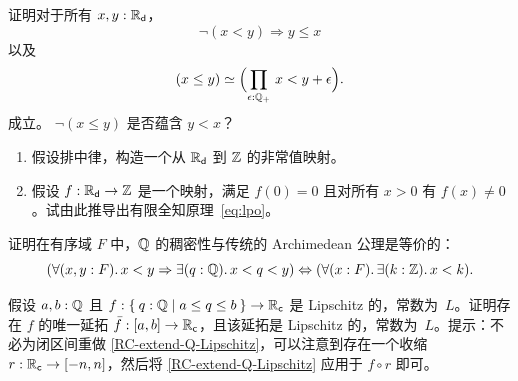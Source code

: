 \begin{ex} \label{ex:RD-lt-vs-le}
  证明对于所有 $x, y : \mathbb{R}_\mathsf{d}$，
  \begin{equation*}
    \lnot (x < y) \Rightarrow y \leq x
  \end{equation*}
  以及
  \begin{equation*}
    \eqv{(x \leq y)}{\Parens{\prd{\epsilon : \Qp} x < y + \epsilon}}.
  \end{equation*}
  成立。
  $\lnot (x \leq y)$ 是否蕴含 $y < x$？
\end{ex}

\begin{ex} \label{ex:reals-non-constant-into-Z}
  \mbox{}
  \begin{enumerate}
  \item
    假设排中律，构造一个从 $\mathbb{R}_\mathsf{d}$ 到 $\mathbb{Z}$ 的非常值映射。
  \item
    假设 $f : \mathbb{R}_\mathsf{d} \to \mathbb{Z}$ 是一个映射，满足 $f(0) = 0$ 且对所有 $x >
    0$ 有 $f(x) \neq 0$。试由此推导出有限全知原理~\eqref{eq:lpo}。
%
  \end{enumerate}
\end{ex}

\begin{ex} \label{ex:traditional-archimedean}
  证明在有序域 $F$ 中，$\mathbb{Q}$ 的稠密性与传统的 Archimedean 公理是等价的：
  \begin{equation*}
    (\fall{x, y : F} x < y \Rightarrow \exis{q : \Q} x < q < y)
    \Leftrightarrow
    (\fall{x : F} \exis{k : \Z} x < k).
  \end{equation*}
\end{ex}

\begin{ex} \label{RC-Lipschitz-on-interval} 假设 $a, b : \mathbb{Q}$ 且 $f : \setof{ q : \Q |
    a \leq q \leq b } \to \RC$ 是 Lipschitz 的，常数为~$L$。证明存在 $f$ 的唯一延拓 $\bar{f} : [a,b] \to \mathbb{R}_\mathsf{c}$，且该延拓是 Lipschitz 的，常数为~$L$。提示：不必为闭区间重做 \cref{RC-extend-Q-Lipschitz}，可以注意到存在一个收缩 $r : \mathbb{R}_\mathsf{c} \to [-n,n]$，然后将 \cref{RC-extend-Q-Lipschitz} 应用于 $f \circ r$ 即可。
\end{ex}

